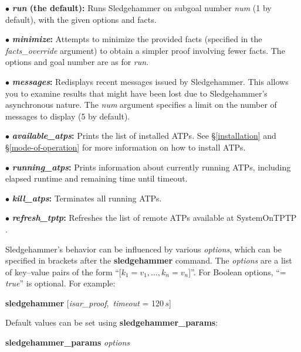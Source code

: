 \documentclass[a4paper,12pt]{article}
\begin{document}
\begin{enum}
\item[$\bullet$] \textbf{\textit{run} (the default):} Runs Sledgehammer on subgoal number
\textit{num} (1 by default), with the given options and facts.

\item[$\bullet$] \textbf{\textit{minimize}:} Attempts to minimize the provided facts
(specified in the \textit{facts\_override} argument) to obtain a simpler proof
involving fewer facts. The options and goal number are as for \textit{run}.

\item[$\bullet$] \textbf{\textit{messages}:} Redisplays recent messages issued by
Sledgehammer. This allows you to examine results that might have been lost due
to Sledgehammer's asynchronous nature. The \textit{num} argument specifies a
limit on the number of messages to display (5 by default).

\item[$\bullet$] \textbf{\textit{available\_atps}:} Prints the list of installed ATPs.
See \S\ref{installation} and \S\ref{mode-of-operation} for more information on
how to install ATPs.

\item[$\bullet$] \textbf{\textit{running\_atps}:} Prints information about currently
running ATPs, including elapsed runtime and remaining time until timeout.

\item[$\bullet$] \textbf{\textit{kill\_atps}:} Terminates all running ATPs.

\item[$\bullet$] \textbf{\textit{refresh\_tptp}:} Refreshes the list of remote
ATPs available at System\-On\-TPTP \cite{sutcliffe-2000}.
\end{enum}

Sledgehammer's behavior can be influenced by various \textit{options}, which can
be specified in brackets after the \textbf{sledgehammer} command. The
\textit{options} are a list of key--value pairs of the form ``[$k_1 = v_1,
\ldots, k_n = v_n$]''. For Boolean options, ``= \textit{true}'' is optional. For
example:

\prew
\textbf{sledgehammer} [\textit{isar\_proof}, \,\textit{timeout} = 120$\,s$]
\postw

Default values can be set using \textbf{sledgehammer\_\allowbreak params}:

\prew
\textbf{sledgehammer\_params} \textit{options}
\postw
\end{document}
